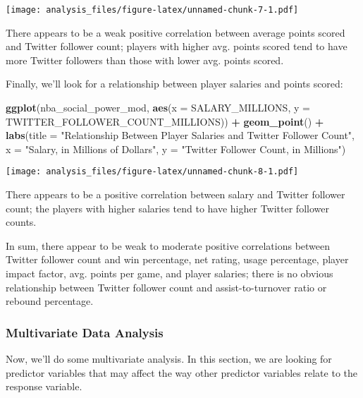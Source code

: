 \documentclass[]{article}
\newenvironment{Shaded}{\begin{snugshade}}{\end{snugshade}}
\newcommand{\DataTypeTok}[1]{\textcolor[rgb]{0.13,0.29,0.53}{#1}}
\newcommand{\KeywordTok}[1]{\textcolor[rgb]{0.13,0.29,0.53}{\textbf{#1}}}
\newcommand{\NormalTok}[1]{#1}
\newcommand{\OperatorTok}[1]{\textcolor[rgb]{0.81,0.36,0.00}{\textbf{#1}}}
\newcommand{\StringTok}[1]{\textcolor[rgb]{0.31,0.60,0.02}{#1}}
\begin{document}
\texttt{[image: analysis\_files/figure-latex/unnamed-chunk-7-1.pdf]}

There appears to be a weak positive correlation between average points
scored and Twitter follower count; players with higher avg. points
scored tend to have more Twitter followers than those with lower avg.
points scored.

Finally, we'll look for a relationship between player salaries and
points scored:

\begin{Shaded}
\begin{Highlighting}[]
\KeywordTok{ggplot}\NormalTok{(nba_social_power_mod, }\KeywordTok{aes}\NormalTok{(}\DataTypeTok{x =}\NormalTok{ SALARY_MILLIONS, }\DataTypeTok{y =}\NormalTok{ TWITTER_FOLLOWER_COUNT_MILLIONS)) }\OperatorTok{+}\StringTok{ }
\StringTok{  }\KeywordTok{geom_point}\NormalTok{() }\OperatorTok{+}\StringTok{ }
\StringTok{  }\KeywordTok{labs}\NormalTok{(}\DataTypeTok{title =} \StringTok{"Relationship Between Player Salaries and Twitter Follower Count"}\NormalTok{,}
       \DataTypeTok{x =} \StringTok{"Salary, in Millions of Dollars"}\NormalTok{,}
       \DataTypeTok{y =} \StringTok{"Twitter Follower Count, in Millions"}\NormalTok{)}
\end{Highlighting}
\end{Shaded}

\texttt{[image: analysis\_files/figure-latex/unnamed-chunk-8-1.pdf]}

There appears to be a positive correlation between salary and Twitter
follower count; the players with higher salaries tend to have higher
Twitter follower counts.

In sum, there appear to be weak to moderate positive correlations
between Twitter follower count and win percentage, net rating, usage
percentage, player impact factor, avg. points per game, and player
salaries; there is no obvious relationship between Twitter follower
count and assist-to-turnover ratio or rebound percentage.

\hypertarget{multivariate-data-analysis}{%
\subsubsection{Multivariate Data
Analysis}\label{multivariate-data-analysis}}

Now, we'll do some multivariate analysis. In this section, we are
looking for predictor variables that may affect the way other predictor
variables relate to the response variable.
\end{document}

